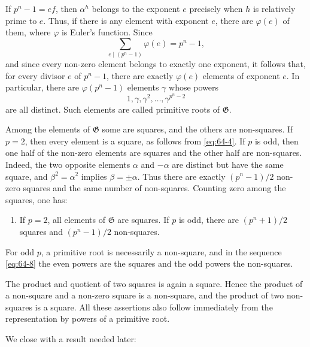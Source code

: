 \documentclass[11pt,a4paper]{book}
\begin{document}
If \(p^n-1=ef\), then \(\alpha^h\) belongs to the exponent \(e\) precisely when \(h\) is relatively prime to \(e\).  Thus, if there is any element with exponent \(e\), there are \(\varphi(e)\) of them, where \(\varphi\) is Euler's function.  Since
\begin{equation}\label{eq:64-6}
 \sum_{e\mid(p^n-1)}\varphi(e)=p^n-1,
\end{equation}
and since every non-zero element belongs to exactly one exponent, it follows that, for every divisor \(e\) of \(p^n-1\), there are exactly \(\varphi(e)\) elements of exponent \(e\).  In particular, there are \(\varphi(p^n-1)\) elements \(\gamma\) whose powers
\begin{equation}\label{eq:64-8}
 1,\gamma,\gamma^2,\ldots,\gamma^{p^n-2}
\end{equation}
are all distinct.  Such elements are called primitive roots of \(\mathfrak G\).

Among the elements of \(\mathfrak G\) some are squares, and the others are non-squares.  If \(p=2\), then every element is a square, as follows from \eqref{eq:64-4}.  If \(p\) is odd, then one half of the non-zero elements are squares and the other half are non-squares.  Indeed, the two opposite elements \(\alpha\) and \(-\alpha\) are distinct but have the same square, and \(\beta^2=\alpha^2\) implies \(\beta=\pm\alpha\).  Thus there are exactly \((p^n-1)/2\) non-zero squares and the same number of non-squares.  Counting zero among the squares, one has:

\begin{enumerate}[label=\arabic*.,resume]
\item If \(p=2\), all elements of \(\mathfrak G\) are squares.  If \(p\) is odd, there are \((p^n+1)/2\) squares and \((p^n-1)/2\) non-squares.
\end{enumerate}
For odd \(p\), a primitive root is necessarily a non-square, and in the sequence \eqref{eq:64-8} the even powers are the squares and the odd powers the non-squares.

The product and quotient of two squares is again a square.  Hence the product of a non-square and a non-zero square is a non-square, and the product of two non-squares is a square.  All these assertions also follow immediately from the representation by powers of a primitive root.

We close with a result needed later:
\end{document}
